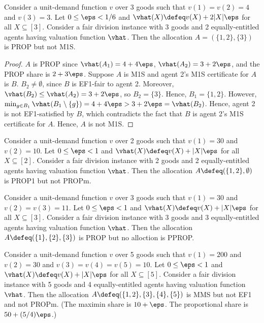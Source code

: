 \begin{lemma}
\label{cex:prop-not-m1s-unit-demand}
Consider a unit-demand function $v$ over 3 goods such that $v(1) = v(2) = 4$ and $v(3) = 3$.
Let $0 \le \eps < 1/6$ and $\vhat(X) \defeq v(X) + 2|X|\eps$ for all $X \subseteq [3]$.
Consider a fair division instance with 3 goods and
2 equally-entitled agents having valuation function $\vhat$.
Then the allocation $A = (\{1, 2\}, \{3\})$ is PROP but not M1S.
\end{lemma}
\begin{proof}
$A$ is PROP since $\vhat(A_1) = 4+4\eps$, $\vhat(A_2) = 3+2\eps$, and the PROP share is $2+3\eps$.
Suppose $A$ is M1S and agent 2's M1S certificate for $A$ is $B$.
$B_2 \neq \emptyset$, since $B$ is EF1-fair to agent 2.
Moreover, $\vhat(B_2) \le \vhat(A_2) = 3 + 2\eps$, so $B_2 = \{3\}$. Hence, $B_1 = \{1, 2\}$.
However, $\min_{g \in B_1} \vhat(B_1 \setminus \{g\}) = 4 + 4\eps > 3 + 2\eps = \vhat(B_2)$.
Hence, agent 2 is not EF1-satisfied by $B$, which contradicts the fact that $B$
is agent 2's M1S certificate for $A$. Hence, $A$ is not M1S.
\end{proof}

\begin{example}
\label{cex:ud:prop1-not-propm}
Consider a unit-demand function $v$ over 2 goods such that $v(1) = 30$ and $v(2) = 10$.
Let $0 \le \eps < 1$ and $\vhat(X) \defeq v(X) + |X|\eps$ for all $X \subseteq [2]$.
Consider a fair division instance with 2 goods and
2 equally-entitled agents having valuation function $\vhat$.
Then the allocation $A \defeq (\{1, 2\}, \emptyset)$ is PROP1 but not PROPm.
\end{example}

\begin{example}
\label{cex:ud:prop-not-pprop}
Consider a unit-demand function $v$ over 3 goods such that $v(1) = 30$ and $v(2) = v(3) = 11$.
Let $0 \le \eps < 1$ and $\vhat(X) \defeq v(X) + |X|\eps$ for all $X \subseteq [3]$.
Consider a fair division instance with 3 goods and
3 equally-entitled agents having valuation function $\vhat$.
Then the allocation $A \defeq (\{1\}, \{2\}, \{3\})$ is PROP but no alloction is PPROP.
\end{example}

\begin{example}
\label{cex:ud:mms-not-ef1-propm}
Consider a unit-demand function $v$ over 5 goods such that
$v(1) = 200$ and $v(2) = 30$ and $v(3) = v(4) = v(5) = 10$.
Let $0 \le \eps < 1$ and $\vhat(X) \defeq v(X) + |X|\eps$ for all $X \subseteq [5]$.
Consider a fair division instance with 5 goods and
4 equally-entitled agents having valuation function $\vhat$.
Then the allocation $A \defeq (\{1, 2\}, \{3\}, \{4\}, \{5\})$
is MMS but not EF1 and not PROPm.
(The maximin share is $10 + \eps$. The proportional share is $50 + (5/4)\eps$.)
\end{example}

